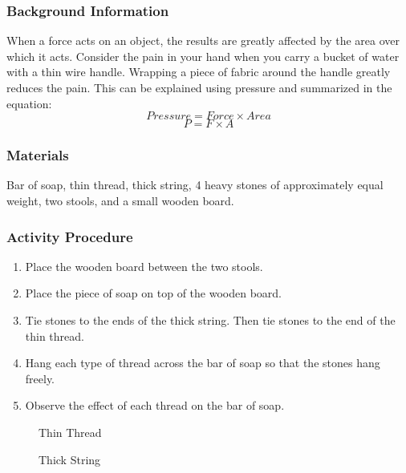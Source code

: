 \subsubsection*{Background Information}
When a force acts on an object, the results are greatly affected by the area over which it acts. Consider the pain in your hand when you carry a bucket of water with a thin wire handle. Wrapping a piece of fabric around the handle greatly reduces the pain. This can be explained using pressure and summarized in the equation:
$$Pressure=Force \times Area$$
$$P=F\times A$$

\subsubsection*{Materials}
Bar of soap, thin thread, thick string, 4 heavy stones of approximately equal weight, two stools, and a small wooden board.

\subsubsection*{Activity Procedure}
\begin{enumerate}
\item{Place the wooden board between the two stools.}
\item{Place the piece of soap on top of the wooden board. }
\item{Tie stones to the ends of the thick string. Then tie stones to the end of the thin thread.} 
\item{Hang each type of thread across the bar of soap so that the stones hang freely.} 
\item{Observe the effect of each thread on the bar of soap.} 
\end{enumerate}

\begin{figure}
\begin{center}
\def\svgwidth{150pt}

\caption{Thin Thread}
\label{fig:pressure-solid1}
\end{center}
\end{figure}

\begin{figure}
\begin{center}
\def\svgwidth{150pt}

\caption{Thick String}
\label{fig:pressure-solid2}
\end{center}
\end{figure}


